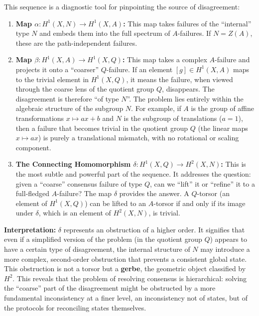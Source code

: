 \documentclass[
]{article}
\begin{document}
This sequence is a diagnostic tool for pinpointing the source of
disagreement:

\begin{enumerate}
\def\labelenumi{\arabic{enumi}.}
\item
  \textbf{Map \(\alpha: H^1(X, N) \to H^1(X, A)\):} This map takes
  failures of the ``internal'' type \(N\) and embeds them into the full
  spectrum of \(A\)-failures. If \(N = Z(A)\), these are the
  path-independent failures.
\item
  \textbf{Map \(\beta: H^1(X, A) \to H^1(X, Q)\):} This map takes a
  complex \(A\)-failure and projects it onto a ``coarser''
  \(Q\)-failure. If an element \([g] \in H^1(X, A)\) maps to the trivial
  element in \(H^1(X, Q)\), it means the failure, when viewed through
  the coarse lens of the quotient group \(Q\), disappears. The
  disagreement is therefore ``of type \(N\)''. The problem lies entirely
  within the algebraic structure of the subgroup \(N\). For example, if
  \(A\) is the group of affine transformations \(x \mapsto ax+b\) and
  \(N\) is the subgroup of translations (\(a=1\)), then a failure that
  becomes trivial in the quotient group \(Q\) (the linear maps
  \(x \mapsto ax\)) is purely a translational mismatch, with no
  rotational or scaling component.
\item
  \textbf{The Connecting Homomorphism
  \(\delta: H^1(X, Q) \to H^2(X, N)\):} This is the most subtle and
  powerful part of the sequence. It addresses the question: given a
  ``coarse'' consensus failure of type \(Q\), can we ``lift'' it or
  ``refine'' it to a full-fledged \(A\)-failure? The map \(\delta\)
  provides the answer. A \(Q\)-torsor (an element of \(H^1(X, Q)\)) can
  be lifted to an \(A\)-torsor if and only if its image under
  \(\delta\), which is an element of \(H^2(X, N)\), is trivial.
\end{enumerate}

\textbf{Interpretation:} \(\delta\) represents an obstruction of a
higher order. It signifies that even if a simplified version of the
problem (in the quotient group \(Q\)) appears to have a certain type of
disagreement, the internal structure of \(N\) may introduce a more
complex, second-order obstruction that prevents a consistent global
state. This obstruction is not a torsor but a \textbf{gerbe}, the
geometric object classified by \(H^2\). This reveals that the problem of
resolving consensus is hierarchical: solving the ``coarse'' part of the
disagreement might be obstructed by a more fundamental inconsistency at
a finer level, an inconsistency not of states, but of the protocols for
reconciling states themselves.
\end{document}
